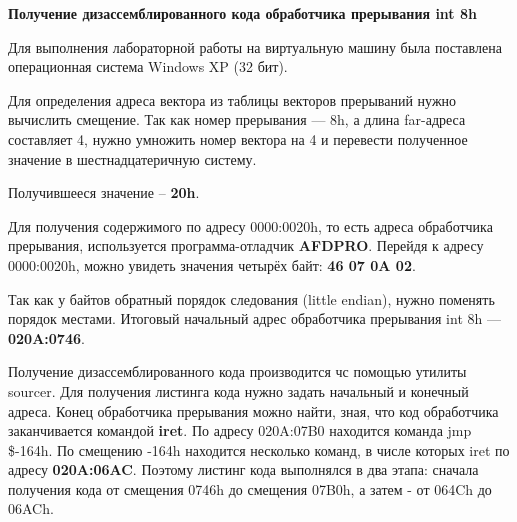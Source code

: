 \begin{center}
	{\textbf{\normalsize Получение дизассемблированного кода обработчика прерывания int 8h}}
\end{center}

Для выполнения лабораторной работы на виртуальную машину была поставлена операционная система Windows XP (32 бит).

Для определения адреса вектора из таблицы векторов прерываний нужно вычислить смещение.
Так как номер прерывания --- 8h, а длина far-адреса составляет 4, нужно умножить номер вектора на 4 и
перевести полученное значение в шестнадцатеричную систему.

Получившееся значение -- \textbf{20h}.

Для получения содержимого по адресу 0000:0020h, то есть адреса обработчика прерывания, используется программа-отладчик
\textbf{AFDPRO}.
Перейдя к адресу 0000:0020h, можно увидеть значения четырёх байт: \textbf{46 07 0A 02}.

Так как у байтов обратный порядок следования (little endian), нужно поменять порядок местами.
Итоговый начальный адрес обработчика прерывания int 8h --- \textbf{020A:0746}.

Получение дизассемблированного кода производится чс помощью утилиты sourcer.
Для получения листинга кода нужно задать начальный и конечный адреса.
Конец обработчика прерывания можно найти, зная, что код обработчика заканчивается командой \textbf{iret}.
По адресу {020A:07B0} находится команда jmp \$-164h.
По смещению -164h находится несколько команд, в числе которых iret по адресу \textbf{020A:06AC}.
Поэтому листинг кода выполнялся в два этапа: сначала получения кода от смещения 0746h до смещения 07B0h,
а затем - от 064Ch до 06ACh.
